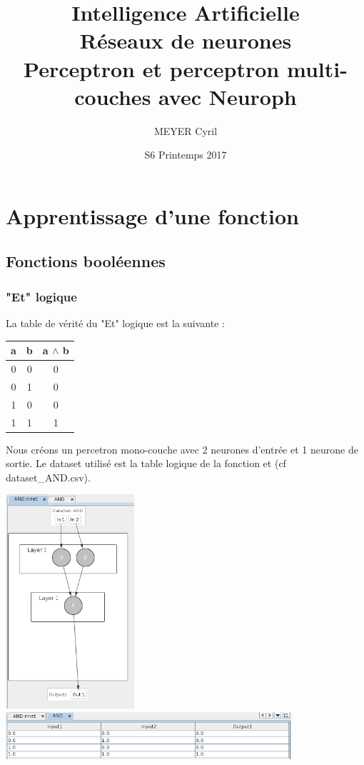 \documentclass[10pt]{report}
\title{Intelligence Artificielle\\Réseaux de neurones\\Perceptron et perceptron multi-couches avec Neuroph}
\date{S6 Printemps 2017}
\author{MEYER Cyril}
\begin{document}

\maketitle
\newpage
\tableofcontents
\newpage

\chapter{Apprentissage d'une fonction}
\section{Fonctions booléennes}
\subsection{"Et" logique}
La table de vérité du "Et" logique est la suivante :\\

\begin{center}
\begin{tabular}{|c|c|c|}
	\hline
	a & b & a $\land$ b \\
	\hline
	0 & 0 & 0 \\
	\hline
	0 & 1 & 0 \\
	\hline
	1 & 0 & 0 \\
	\hline
	1 & 1 & 1 \\
	\hline
\end{tabular}
\end{center}

Nous créons un percetron mono-couche avec 2 neurones d'entrée et 1 neurone de sortie. Le dataset utilisé est la table logique de la fonction et (cf dataset\_AND.csv).\\


\begin{center}
\includegraphics[height=300px]{img/AND_NN.png}\\
\includegraphics[width=400px]{img/AND_TS.png}\\
\end{center}
\end{document}
